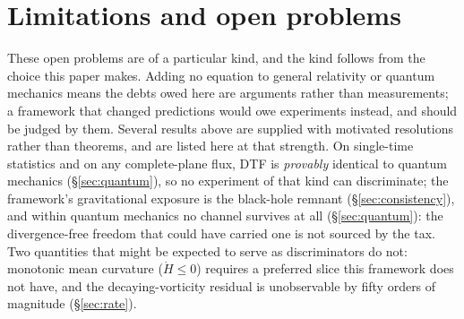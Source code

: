 \documentclass[11pt]{article}
\begin{document}
\section{Limitations and open problems}\label{sec:open}
\noindent These open problems are of a particular kind, and the kind follows from the choice this paper
makes. Adding no equation to general relativity or quantum mechanics means the debts owed here are
arguments rather than measurements; a framework that changed predictions would owe experiments instead,
and should be judged by them. Several results above are supplied with motivated resolutions rather than
theorems, and are listed here at that strength. On single-time statistics and on any complete-plane flux, DTF is \emph{provably}
identical to quantum mechanics (\S\ref{sec:quantum}), so no experiment of that kind can discriminate; the framework's
gravitational exposure is the black-hole remnant (\S\ref{sec:consistency}), and within quantum mechanics no channel survives
at all (\S\ref{sec:quantum}): the divergence-free freedom that could have carried one is not sourced by the tax.
Two quantities that might be expected to serve as discriminators do not: monotonic mean curvature
($\dot H\le0$) requires a preferred slice this framework does not have, and the decaying-vorticity residual
is unobservable by fifty orders of magnitude (\S\ref{sec:rate}).\par\smallskip
\end{document}
